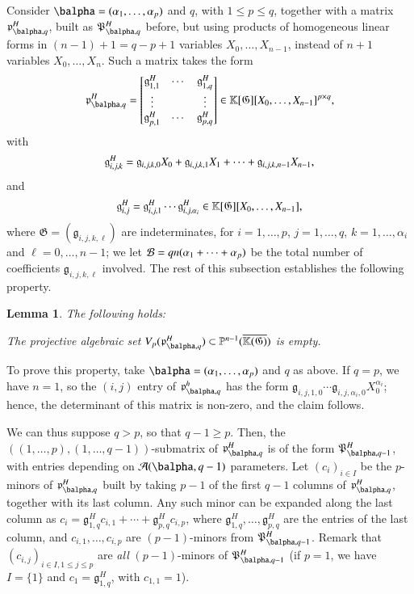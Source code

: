 \documentclass[amsthm]{elsart}
\newtheorem{lemma}[definition]{Lemma}
\begin{document}
Consider $\balpha=(\alpha_1,\dots,\alpha_p)$ and
$q$, with $1 \le p \le q$, together with a matrix
$\mathfrak{p}^H_{\balpha,q}$, built as $\mathfrak{P}^H_{\balpha,q}$
before, but using products of homogeneous linear forms in $(n-1)+1=q-p+1$
variables $X_0,\dots,X_{n-1}$, instead of $n+1$ variables
$X_0,\dots,X_n$. Such a matrix takes the form
\begin{align}\label{eq:matM2}
\mathfrak{p}^H_{\balpha,q}=\left [\begin{matrix}
\mathfrak{g}^H_{1,1} & \cdots & \mathfrak{g}^H_{1,q}\\
 \vdots & & \vdots\\
\mathfrak{g}^H_{p,1} & \cdots & \mathfrak{g}^H_{p,q}
  \end{matrix}\right ]\in \KK[\mathfrak{G}][X_0,\dots,X_{n-1}]^{p\times q},
\end{align}
with 
$$\mathfrak{g}^H_{i,j,k} = \frak{g}_{i,j,k,0}X_0 + \frak{g}_{i,j,k,1} X_1 +\cdots + \frak{g}_{i,j,k,n-1} X_{n-1},$$
and
$$\mathfrak{g}^H_{i,j} = \mathfrak{g}^H_{i,j,1} \cdots
\mathfrak{g}^H_{i,j,\alpha_i} \in
\mathbb{K}[\mathfrak{G}][X_0,\dots,X_{n-1}],$$ where
$\mathfrak{G}=(\mathfrak{g}_{i,j,k,\ell})$ are indeterminates, for
$i=1,\dots,p$, $j=1,\dots,q$, $k=1,\dots,\alpha_i$ and
$\ell=0,\dots,n-1$; we let ${\cal B}=q n (\alpha_1+\cdots +\alpha_p)$
be the total number of coefficients $\mathfrak{g}_{i,j,k,\ell}$
involved. The rest of this subsection establishes the following property.

\begin{lemma}
The following holds:
\begin{description}[leftmargin=*]
\item[$\assI_3(\balpha,q).$] The projective algebraic set
  $V_p(\mathfrak{p}^H_{\balpha,q}) \subset \P^{n-1}(\KKCbar)$ is empty.
\end{description}
\end{lemma}
To prove this property, take $\balpha=(\alpha_1,\dots,\alpha_p)$ and
$q$ as above. If $q=p$, we have $n=1$, so the $(i,j)$ entry of
$\mathfrak{p}^h_{\balpha,q}$ has the form
$\mathfrak{g}_{i,j,1,0}\cdots\mathfrak{g}_{i,j,\alpha_i,0}
X_0^{\alpha_i}$; hence, the determinant of this matrix is non-zero,
and the claim follows.

We can thus suppose $q > p$, so that $q-1 \ge p$.  Then, the
$((1,\dots,p),(1,\dots,q-1))$-submatrix of $\mathfrak{p}^H_{\balpha,q}$ is
of the form $\mathfrak{P}^H_{\balpha,q-1}$, with entries depending on
${\cal A}(\balpha,q-1)$ parameters.  Let $(c_i)_{i \in I}$ be the $p$-minors
of $\mathfrak{p}^H_{\balpha,q}$ built by taking $p-1$ of the first $q-1$
columns of $\mathfrak{p}^H_{\balpha,q}$, together with its last column.
Any such minor can be expanded along the last column as $c_i =
\mathfrak{g}^H_{1,q} c_{i,1} + \cdots + \mathfrak{g}^H_{p,q}
c_{i,p}$, where $\mathfrak{g}^H_{1,q},\dots,\mathfrak{g}^H_{p,q}$ are
the entries of the last column, and $c_{i,1},\dots,c_{i,p}$
are $(p-1)$-minors from $\mathfrak{P}^H_{\balpha,q-1}$. Remark that
$(c_{i,j})_{i \in I, 1 \le j \le p}$ are {\em all} $(p-1)$-minors
of $\mathfrak{P}^H_{\balpha,q-1}$ (if $p=1$, we have $I=\{1\}$ and
$c_1=\mathfrak{g}^H_{1,q}$, with $c_{1,1}=1$).
\end{document}
